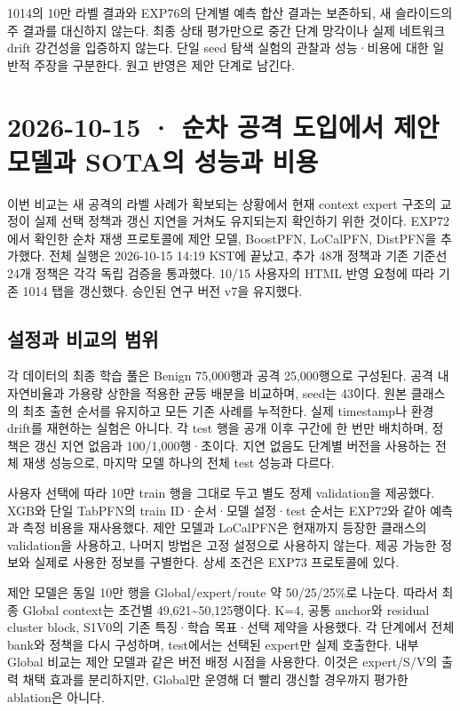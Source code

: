 1014의 10만 라벨 결과와 EXP76의 단계별 예측 합산 결과는 보존하되, 새 슬라이드의 주 결과를 대신하지 않는다. 최종 상태 평가만으로 중간 단계 망각이나 실제 네트워크 drift 강건성을 입증하지 않는다. 단일 seed 탐색 실험의 관찰과 성능·비용에 대한 일반적 주장을 구분한다. 원고 반영은 제안 단계로 남긴다.



\section{2026-10-15 · 순차 공격 도입에서 제안 모델과 SOTA의 성능과 비용}
\label{report:20261015_exp73_results}
이번 비교는 새 공격의 라벨 사례가 확보되는 상황에서 현재 context expert 구조의 교정이 실제 선택 정책과 갱신 지연을 거쳐도 유지되는지 확인하기 위한 것이다. EXP72에서 확인한 순차 재생 프로토콜에 제안 모델, BoostPFN, LoCalPFN, DistPFN을 추가했다. 전체 실행은 2026-10-15 14:19 KST에 끝났고, 추가 48개 정책과 기존 기준선 24개 정책은 각각 독립 검증을 통과했다. 10/\allowbreak{}15 사용자의 HTML 반영 요청에 따라 기존 1014 탭을 갱신했다. 승인된 연구 버전 v7을 유지했다.

\subsection{설정과 비교의 범위}
각 데이터의 최종 학습 풀은 Benign 75,000행과 공격 25,000행으로 구성된다. 공격 내 자연비율과 가용량 상한을 적용한 균등 배분을 비교하며, seed는 43이다. 원본 클래스의 최초 출현 순서를 유지하고 모든 기존 사례를 누적한다. 실제 timestamp나 환경 drift를 재현하는 실험은 아니다. 각 test 행을 공개 이후 구간에 한 번만 배치하며, 정책은 갱신 지연 없음과 100/\allowbreak{}1,000행·초이다. 지연 없음도 단계별 버전을 사용하는 전체 재생 성능으로, 마지막 모델 하나의 전체 test 성능과 다르다.

사용자 선택에 따라 10만 train 행을 그대로 두고 별도 정제 validation을 제공했다. XGB와 단일 TabPFN의 train ID·순서·모델 설정·test 순서는 EXP72와 같아 예측과 측정 비용을 재사용했다. 제안 모델과 LoCalPFN은 현재까지 등장한 클래스의 validation을 사용하고, 나머지 방법은 고정 설정으로 사용하지 않는다. 제공 가능한 정보와 실제로 사용한 정보를 구별한다. 상세 조건은 EXP73 프로토콜에 있다.

제안 모델은 동일 10만 행을 Global/\allowbreak{}expert/\allowbreak{}route 약 50/\allowbreak{}25/\allowbreak{}25\%로 나눈다. 따라서 최종 Global context는 조건별 49,621\textasciitilde{}50,125행이다. K=\allowbreak{}4, 공통 anchor와 residual cluster block, S1V0의 기존 특징·학습 목표·선택 제약을 사용했다. 각 단계에서 전체 bank와 정책을 다시 구성하며, test에서는 선택된 expert만 실제 호출한다. 내부 Global 비교는 제안 모델과 같은 버전 배정 시점을 사용한다. 이것은 expert/\allowbreak{}S/\allowbreak{}V의 출력 채택 효과를 분리하지만, Global만 운영해 더 빨리 갱신할 경우까지 평가한 ablation은 아니다.

